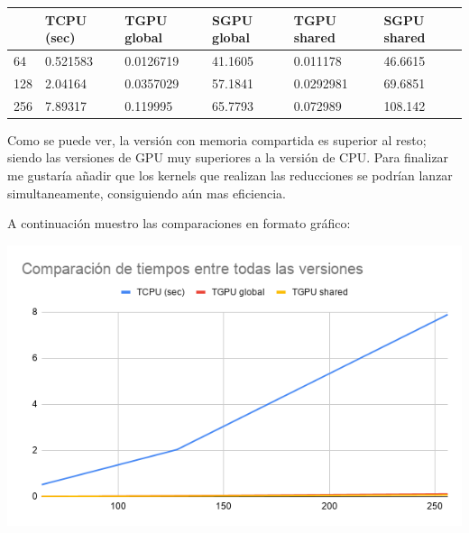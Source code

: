 \begin{table}[H]
	\centering
	\begin{tabular}{|l|l|l|l|l|l|}
		\hline
		& \cellcolor[HTML]{ECF4FF}TCPU (sec) & \cellcolor[HTML]{ECF4FF}TGPU global & \cellcolor[HTML]{ECF4FF}SGPU global & \cellcolor[HTML]{ECF4FF}TGPU shared & \cellcolor[HTML]{ECF4FF}SGPU shared \\ \hline
		\cellcolor[HTML]{FFFFC7}64  & 0.521583                           & 0.0126719                           & 41.1605                             & 0.011178                            & 46.6615                             \\ \hline
		\cellcolor[HTML]{FFFFC7}128 & 2.04164                            & 0.0357029                           & 57.1841                             & 0.0292981                           & 69.6851                             \\ \hline
		\cellcolor[HTML]{FFFFC7}256 & 7.89317                            & 0.119995                            & 65.7793                             & 0.072989                            & 108.142                             \\ \hline
	\end{tabular}
\end{table}

Como se puede ver, la versión con memoria compartida es superior al resto; siendo las versiones de GPU muy superiores a la versión de CPU.
Para finalizar me gustaría añadir que los kernels que realizan las reducciones se podrían lanzar simultaneamente, consiguiendo aún mas eficiencia.

A continuación muestro las comparaciones en formato gráfico:

\begin{center}
	\includegraphics[scale=0.5]{img/compall}
\end{center}

